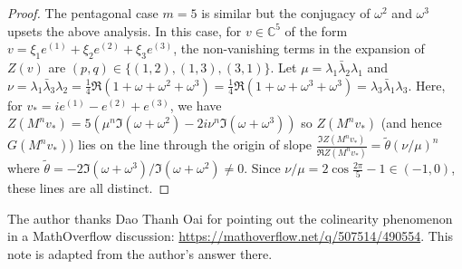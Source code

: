\documentclass{amsart}
\newcommand*\C{\mathbb C}
\theoremstyle{definition}
\begin{document}
\begin{proof}
    The pentagonal case $m=5$ is similar but the conjugacy of $\omega^2$ and $\omega^3$ upsets the above analysis. In this case, for $v\in\C^5$ of the form $v = \xi_1e^{(1)}+\xi_2e^{(2)}+\xi_3e^{(3)}$, the non-vanishing terms in the expansion of $Z(v)$ are $(p,q)\in \{(1,2),(1,3),(3,1)\}$. Let $\mu = \lambda_1\bar\lambda_2\lambda_1$ and $\nu =\lambda_1\bar\lambda_3\lambda_2=\frac14\Re(1+\omega+\omega^2+\omega^3)=\frac14\Re(1+\omega+\omega^3+\omega^3)=\lambda_3\bar\lambda_1\lambda_3$. Here, for $v_*=ie^{(1)}-e^{(2)}+e^{(3)}$, we have $Z(M^nv_*) = 5(\mu^n\Im(\omega+\omega^2)-2i\nu^n\Im(\omega+\omega^3))$ so $Z(M^nv_*)$ (and hence $G(M^nv_*)$) lies on the line through the origin of slope $\frac{\Im Z(M^nv_*)}{\Re Z(M^nv_*)} = \tilde\theta(\nu/\mu)^n$ where $\tilde\theta = -2\Im(\omega+\omega^3)/\Im(\omega+\omega^2) \ne 0$. Since $\nu/\mu = 2\cos\frac{2\pi}{5}-1 \in (-1,0)$, these lines are all distinct.
\end{proof}

 The author thanks Dao Thanh Oai for pointing out the colinearity phenomenon in a MathOverflow discussion: \url{https://mathoverflow.net/q/507514/490554}. This note is adapted from the author's answer there.



\end{document}
